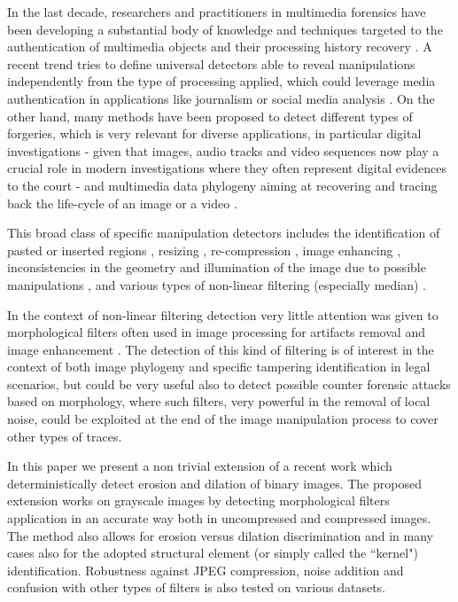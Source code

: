 \documentclass[review]{elsarticle}
\begin{document}
In the last decade, researchers and practitioners in multimedia forensics have been developing a substantial body of knowledge and techniques targeted to the authentication of multimedia objects and their processing history recovery \cite{stamm_overview, farid_book, ho, piva_overview, sencar_book}. 
A recent trend tries to define universal detectors able to reveal manipulations independently from the type of processing applied, which could leverage media authentication in applications like journalism or social media analysis \cite{noiseprint}. 
On the other hand, many methods have been proposed to detect different types of forgeries, which is very relevant for diverse applications, in particular digital investigations - given that images, audio tracks and video sequences now play a crucial role in modern investigations where they often represent digital evidences to the court \cite{forlab} - and multimedia data phylogeny aiming at recovering and tracing back the life-cycle of an image or a video \cite{Bestagini2016, Dias2012, Oliveira2016, Costa2014}.

This broad class of specific manipulation detectors includes the identification of pasted or inserted regions \cite{cm2, cm3, cm4, spl2, spl3}, resizing \cite{fernando2017}, re-compression \cite{PBPG2017-TIFS},  image enhancing \cite{shan2019robust}, inconsistencies in the geometry and illumination of the image due to possible manipulations \cite{geom1, geom2, phys1}, and various types of non-linear filtering (especially median) \cite{Bahrami2015, Cao2014, Cao2011, Fridrich2010, Tian2010, Yuan:2011, Liu2013, Huang2013, Shi2014, Wang2015, gao2019robust}. 

In the context of non-linear filtering detection 
very little attention was given to morphological filters \cite{haas1967morphologie} often used in image processing for artifacts removal and image enhancement \cite{British2012} \cite{Maragos2004}. The detection of this kind of filtering is of interest in the context of both image phylogeny and specific tampering identification in legal scenarios, but could be very useful also to detect possible counter forensic attacks based on morphology, where such filters, very powerful in the removal of local noise, could be exploited at the end of the image manipulation process to cover other types of traces. 

In this paper we present a non trivial extension of a recent work \cite{de2017detecting} which deterministically detect erosion and dilation of binary images. The proposed extension works on grayscale images by detecting morphological filters application in an accurate way both in uncompressed and compressed images. The method also allows for erosion versus dilation discrimination and in many cases also for the adopted structural element (or simply called the ``kernel") identification. 
Robustness against JPEG compression, noise addition and confusion with other types of filters is also tested on various datasets. 
\end{document}
